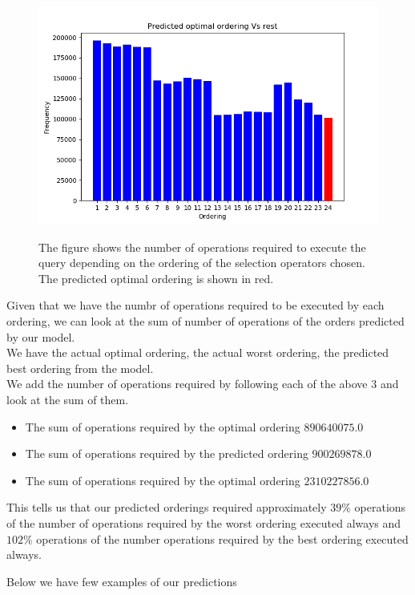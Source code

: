 \begin{figure}
\centering
\includegraphics[scale=0.8]{operations2.png}\\
\caption{The figure shows the number of operations required to execute the query depending on the ordering of the selection operators chosen. The predicted optimal ordering is shown in red.}
\label{fig:operations1}
\end{figure}

\par Given that we have the numbr of operations required to be executed by each ordering, we can look at the sum of number of operations of the orders predicted by our model.\\ 
We have the actual optimal ordering, the actual worst ordering, the predicted best ordering from the model.\\
We add the number of operations required by following each of the above $3$ and look at the sum of them.\\
\begin{itemize}
    \item The sum of operations required by the optimal ordering $890640075.0$
    \item The sum of operations required by the predicted ordering $900269878.0$
    \item The sum of operations required by the optimal ordering $2310227856.0$
\end{itemize}
This tells us that our predicted orderings required approximately $39\%$ operations of the number of operations required by the worst ordering executed always and $102\%$ operations of the number operations required by the best ordering executed always.\\
\par Below we have few examples of our predictions

